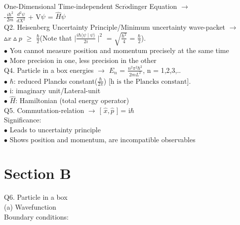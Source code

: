\documentclass[10pt,fancy]{elegantbook}
\begin{document}
{One-Dimensional Time-independent Scr$\ddot{o}$dinger Equation $\longrightarrow$ \\
-$\frac{i \hbar^2}{2m}$ $\frac{d^2 \psi}{d {X}^2}$ + V$\psi$ = $\hat {H} \psi$  \\

Q2. Heisenberg Uncertainty Principle/Minimum uncertainty wave-packet $\longrightarrow$ \\ 
$\vartriangle{x} \vartriangle{p}$ $\geq$ $\frac{\hbar}{2}$(Note that $| \frac{i \hbar \langle \psi \mid\psi \rangle}{2i} \mid^2$ = $ \sqrt{\frac{\hbar^2}{4}}$ = $\frac{\hbar}{2}$). \\

$\bullet$ You cannot measure position and momentum precisely at the same time \\
 
$\bullet$ More precision in one, less precision in the other \\

Q4. Particle in a box energies $\longrightarrow$ $E_n$ = $\frac{n^2 \pi^2 \hbar^2}{{2m}{L^2}}$, n = 1,2,3,..  \\
    
$\bullet$ $\hbar$: reduced Plancks constant($\frac{\hbar}{2 \pi}$) [$\text{h is the Plancks constant}$].  \\
  
$\bullet$ i: imaginary unit/Lateral-unit  \\
      
$\bullet$ $\hat {H}$: Hamiltonian (total energy operator)  \\

Q5. Commutation-relation $\longrightarrow$ [ $\hat {x}, \hat {p}$ ] = i$\hbar$ \\

Significance: \\ 
$\bullet$ Leads to uncertainty principle  \\    
$\bullet$ Shows position and momentum, are incompatible observables \\
 
\section{Section B}

Q6. Particle in a box \\

(a) Wavefunction  \\
 
Boundary conditions:  \\
  
}
\end{document}
